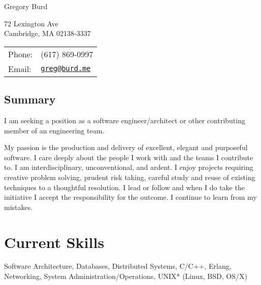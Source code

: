 \documentclass[letterpaper]{article}
\def\name{Gregory Burd}
\renewenvironment{itemize}{
  \begin{list}{}{
    \setlength{\leftmargin}{1.5em}
  }
}{
  \end{list}
}
\begin{document}
{\huge \name}


\vspace{0.25in}

\begin{minipage}{0.45\linewidth}
  72 Lexington Ave \\
  Cambridge, MA 02138-3337
\end{minipage}
\begin{minipage}{0.45\linewidth}
  \begin{tabular}{ll}
    Phone: & (617) 869-0997 \\
    Email: & \href{mailto:greg@burd.me}{\tt greg@burd.me} \\
  \end{tabular}
\end{minipage}

\vspace{0.25in}

\subsection*{Summary}

\begin{itemize}

\item I am seeking a position as a software engineer/architect or other
  contributing member of an engineering team.

\item My passion is the production and delivery of excellent, elegant and
  purposeful software. I care deeply about the people I work with and the teams
  I contribute to. I am interdisciplinary, unconventional, and ardent. I enjoy
  projects requiring creative problem solving, prudent risk taking, careful
  study and reuse of existing techniques to a thoughtful resolution. I lead or
  follow and when I do take the initiative I accept the responsibility for the
  outcome. I continue to learn from my mistakes.

\end{itemize}


\section*{Current Skills}

\begin{itemize}
\item Software Architecture, Databases, Distributed Systems, C/C++, Erlang,
  Networking, System Administration/Operations, UNIX* (Linux, BSD, OS/X)
\end{itemize}
\end{document}
